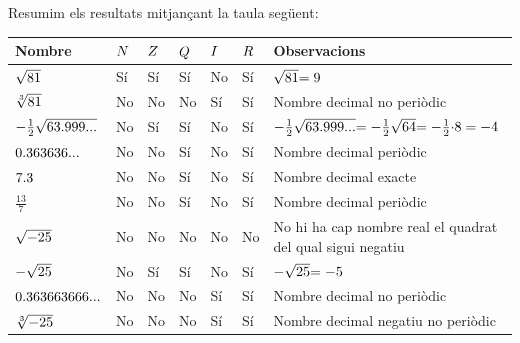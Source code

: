 \begin{solucio}
Resumim els resultats mitjançant la taula següent:%
\begin{center}
\begin{tabular}{l|l|l|l|l|l|l}
{\small Nombre} & ${\small N}$ & ${\small Z}$ & ${\small Q}$ & ${\small I%
}$ & ${\small R}$ & {\small Observacions} \\ \hline
$\sqrt{{\small 81}}$ & {\small Sí} & {\small Sí} & {\small Sí}
& {\small No} & {\small Sí} & $\sqrt{{\small 81}}{\small =9}$ \\ 
$\sqrt[3]{{\small 81}}$ & {\small No} & {\small No} & {\small No} & {\small Sí} & {\small Sí} & {\small Nombre decimal no periòdic} \\ 
${\small -}\frac{1}{2}\sqrt{{\small 63.999...}}$ & {\small No} & {\small Sí} & {\small Sí} & {\small No} & {\small Sí} & ${\small -}%
\frac{1}{2}\sqrt{{\small 63.999...}}{\small =-}\frac{1}{2}\sqrt{{\small 64}}%
{\small =-}\frac{1}{2}{\small \cdot 8=-4}$ \\ 
${\small 0.363636...}$ & {\small No} & {\small No} & {\small Sí} & 
{\small No} & {\small Sí} & {\small Nombre decimal periòdic}
\\ 
${\small 7.3}$ & {\small No} & {\small No} & {\small Sí} & {\small No}
& {\small Sí} & {\small Nombre decimal exacte} \\ 
$\frac{13}{7}$ & {\small No} & {\small No} & {\small Sí} & {\small No}
& {\small Sí} & {\small Nombre decimal periòdic} \\ 
$\sqrt{{\small -25}}$ & {\small No} & {\small No} & {\small No} & {\small No}
& {\small No} & {\small No hi ha cap nombre real el quadrat del qual
sigui negatiu} \\ 
${\small -}\sqrt{{\small 25}}$ & {\small No} & {\small Sí} & {\small Sí} & {\small No} & {\small Sí} & ${\small -}\sqrt{{\small 25}}%
{\small =-5}$ \\ 
${\small 0.363663666...}$ & {\small No} & {\small No} & {\small No} & 
{\small Sí} & {\small Sí} & {\small Nombre decimal no periòdic} \\ 
$\sqrt[3]{{\small -25}}$ & {\small No} & {\small No} & {\small No} & {\small Sí} & {\small Sí} & {\small Nombre decimal negatiu no periòdic}%
\end{tabular}
\end{center}
\end{solucio}

